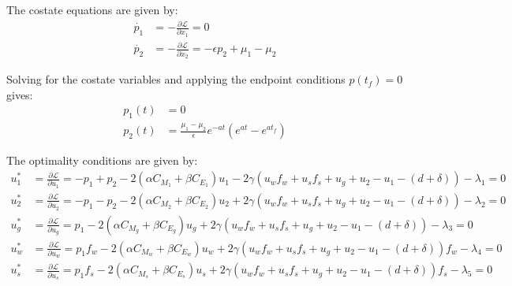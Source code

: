 \documentclass[12pt]{article}
\begin{document}
The costate equations are given by:
\begin{align*}
    \dot{p_1} &= -\frac{\partial \mathcal{L}}{\partial x_1} = 0 \\
    \dot{p_2} &= -\frac{\partial \mathcal{L}}{\partial x_2} = -\epsilon p_2 + \mu_1 - \mu_2
\end{align*}

Solving for the costate variables and applying the endpoint conditions $p(t_f) = 0$  gives:
\begin{align*}
    p_1(t) &= 0 \\
    p_2(t) &= \frac{\mu_1 - \mu_2}{\epsilon}e^{-at}(e^{at}-e^{at_f})
\end{align*}


The optimality conditions are given by:
\begin{align*}
    u_1^* &= \frac{\partial \mathcal{L}}{\partial u_1} = -p_1 + p_2 - 2(\alpha C_{M_1} + \beta C_{E_1})u_1 - 2\gamma (u_w f_w + u_s f_s + u_g + u_2 - u_1 - (d + \delta)) - \lambda_1 = 0 \\
    u_2^* &= \frac{\partial \mathcal{L}}{\partial u_2} = -p_1 - p_2 - 2(\alpha C_{M_2} + \beta C_{E_2})u_2 + 2\gamma (u_w f_w + u_s f_s + u_g + u_2 - u_1 - (d + \delta)) - \lambda_2 = 0 \\
    u_g^* &= \frac{\partial \mathcal{L}}{\partial u_g} = p_1 - 2(\alpha C_{M_g} + \beta C_{E_g})u_g + 2\gamma (u_w f_w + u_s f_s + u_g + u_2 - u_1 - (d + \delta)) - \lambda_3 = 0\\
    u_w^* &= \frac{\partial \mathcal{L}}{\partial u_w} = p_1f_w - 2(\alpha C_{M_w} + \beta C_{E_w})u_w + 2\gamma (u_w f_w + u_s f_s + u_g + u_2 - u_1 - (d + \delta))f_w - \lambda_4 = 0\\
    u_s^* &= \frac{\partial \mathcal{L}}{\partial u_s} = p_1f_s - 2(\alpha C_{M_s} + \beta C_{E_s})u_s + 2\gamma (u_w f_w + u_s f_s + u_g + u_2 - u_1 - (d + \delta))f_s - \lambda_5 = 0
\end{align*}
\end{document}
